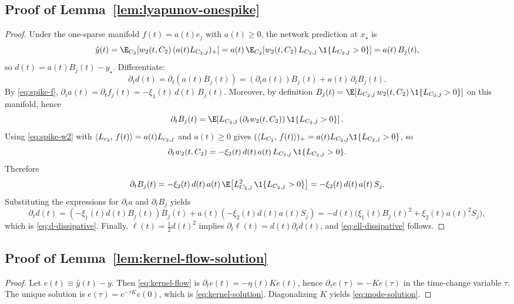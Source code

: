 \subsection*{Proof of Lemma~\ref{lem:lyapunov-onespike}}
\begin{proof}
Under the one-sparse manifold $f(t)=a(t)e_j$ with $a(t)\ge 0$, the network prediction at $x_\star$ is
\[
\hat y(t)=\E_{C_2}\!\left[w_2(t,C_2)\,(a(t)L_{C_2,j})_+\right]
=a(t)\,\E_{C_2}\!\left[w_2(t,C_2)\,L_{C_2,j}\,\1\{L_{C_2,j}>0\}\right]
=a(t)\,B_j(t),
\]
so $d(t)=a(t)B_j(t)-y_\star$.
Differentiate:
\[
\partial_t d(t)=\partial_t(a(t)B_j(t))=(\partial_t a(t))B_j(t)+a(t)\,\partial_t B_j(t).
\]
By \eqref{eq:spike-f}, $\partial_t a(t)=\partial_t f_j(t)=-\xi_1(t)\,d(t)\,B_j(t)$.
Moreover, by definition $B_j(t)=\E[L_{C_2,j}\,w_2(t,C_2)\,\1\{L_{C_2,j}>0\}]$ on this manifold, hence
\[
\partial_t B_j(t)=\E\!\left[L_{C_2,j}\,(\partial_t w_2(t,C_2))\,\1\{L_{C_2,j}>0\}\right].
\]
Using \eqref{eq:spike-w2} with $\left\langle L_{c_2},\,f(t) \right\rangle=a(t)L_{c_2,j}$ and $a(t)\ge 0$ gives
$(\ip{L_{C_2}}{f(t)})_+=a(t)L_{C_2,j}\1\{L_{C_2,j}>0\}$, so
\[
\partial_t w_2(t,C_2)=-\xi_2(t)\,d(t)\,a(t)\,L_{C_2,j}\,\1\{L_{C_2,j}>0\}.
\]
Therefore
\[
\partial_t B_j(t)
=-\xi_2(t)\,d(t)\,a(t)\,\E\!\left[L_{C_2,j}^2\,\1\{L_{C_2,j}>0\}\right]
=-\xi_2(t)\,d(t)\,a(t)\,S_j.
\]
Substituting the expressions for $\partial_t a$ and $\partial_t B_j$ yields
\[
\partial_t d(t)=(-\xi_1(t)d(t)B_j(t))B_j(t)+a(t)(-\xi_2(t)d(t)a(t)S_j)
=-d(t)\Big(\xi_1(t)B_j(t)^2+\xi_2(t)a(t)^2S_j\Big),
\]
which is \eqref{eq:d-dissipative}.
Finally, $\ell(t)=\tfrac12 d(t)^2$ implies $\partial_t\ell(t)=d(t)\partial_t d(t)$, and \eqref{eq:ell-dissipative} follows.
\end{proof}

\subsection*{Proof of Lemma~\ref{lem:kernel-flow-solution}}
\begin{proof}
Let $e(t)\equiv \hat y(t)-y$.
Then \eqref{eq:kernel-flow} is $\partial_t e(t)=-\eta(t)K e(t)$, hence $\partial_\tau e(\tau)=-K e(\tau)$ in the time-change variable $\tau$.
The unique solution is $e(\tau)=e^{-\tau K}e(0)$, which is \eqref{eq:kernel-solution}.
Diagonalizing $K$ yields \eqref{eq:mode-solution}.
\end{proof}

